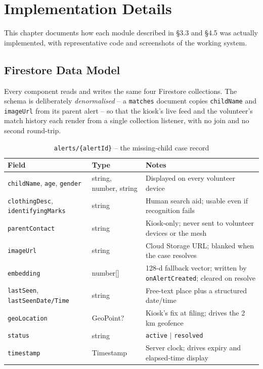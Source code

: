 \documentclass[12pt,a4paper,oneside]{report}
\newcommand{\code}[1]{\texttt{#1}}
\begin{document}
\chapter{Implementation Details}

This chapter documents how each module described in \S3.3 and \S4.5 was
actually implemented, with representative code and screenshots of the
working system.

\section{Firestore Data Model}
\label{sec:firestore-schema}

Every component reads and writes the same four Firestore collections. The
schema is deliberately \emph{denormalised} -- a \code{matches} document
copies \code{childName} and \code{imageUrl} from its parent alert -- so
that the kiosk's live feed and the volunteer's match history each render
from a single collection listener, with no join and no second round-trip.

\begin{table}[H]
\centering
\caption{\code{alerts/\{alertId\}} -- the missing-child case record}
\begin{tabular}{|p{3.4cm}|p{2.2cm}|p{7.1cm}|}
\hline
\textbf{Field} & \textbf{Type} & \textbf{Notes} \\
\hline
\code{childName}, \code{age}, \code{gender} & string, number, string & Displayed on every volunteer device \\ \hline
\code{clothingDesc}, \code{identifyingMarks} & string & Human search aid; usable even if recognition fails \\ \hline
\code{parentContact} & string & Kiosk-only; never sent to volunteer devices or the mesh \\ \hline
\code{imageUrl} & string & Cloud Storage URL; blanked when the case resolves \\ \hline
\code{embedding} & number[] & 128-d fallback vector; written by \code{onAlertCreated}; cleared on resolve \\ \hline
\code{lastSeen}, \code{lastSeenDate/Time} & string & Free-text place plus a structured date/time \\ \hline
\code{geoLocation} & GeoPoint? & Kiosk's fix at filing; drives the 2\,km geofence \\ \hline
\code{status} & string & \code{active} $\mid$ \code{resolved} \\ \hline
\code{timestamp} & Timestamp & Server clock; drives expiry and elapsed-time display \\
\hline
\end{tabular}
\end{table}
\end{document}
